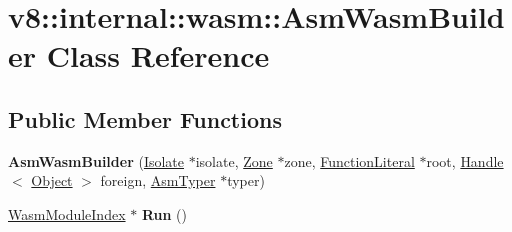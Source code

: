 \hypertarget{classv8_1_1internal_1_1wasm_1_1_asm_wasm_builder}{}\section{v8\+:\+:internal\+:\+:wasm\+:\+:Asm\+Wasm\+Builder Class Reference}
\label{classv8_1_1internal_1_1wasm_1_1_asm_wasm_builder}
\subsection*{Public Member Functions}
\begin{DoxyCompactItemize}
\item 
{\bfseries Asm\+Wasm\+Builder} (\hyperlink{classv8_1_1internal_1_1_isolate}{Isolate} $\ast$isolate, \hyperlink{classv8_1_1internal_1_1_zone}{Zone} $\ast$zone, \hyperlink{classv8_1_1internal_1_1_function_literal}{Function\+Literal} $\ast$root, \hyperlink{classv8_1_1internal_1_1_handle}{Handle}$<$ \hyperlink{classv8_1_1internal_1_1_object}{Object} $>$ foreign, \hyperlink{classv8_1_1internal_1_1_asm_typer}{Asm\+Typer} $\ast$typer)\hypertarget{classv8_1_1internal_1_1wasm_1_1_asm_wasm_builder_a8b3d3f9df63b12b2712b8c4886f1c33d}{}\label{classv8_1_1internal_1_1wasm_1_1_asm_wasm_builder_a8b3d3f9df63b12b2712b8c4886f1c33d}

\item 
\hyperlink{classv8_1_1internal_1_1wasm_1_1_wasm_module_index}{Wasm\+Module\+Index} $\ast$ {\bfseries Run} ()\hypertarget{classv8_1_1internal_1_1wasm_1_1_asm_wasm_builder_ac56405640bd7a20328883f689f700de3}{}\label{classv8_1_1internal_1_1wasm_1_1_asm_wasm_builder_ac56405640bd7a20328883f689f700de3}

\end{DoxyCompactItemize}
